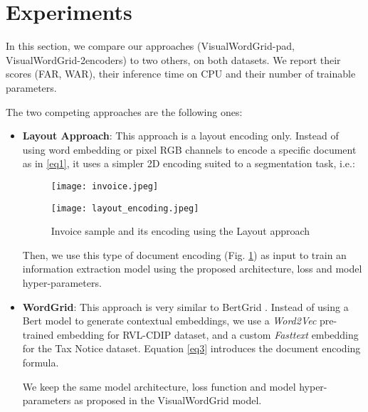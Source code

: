 \documentclass[conference]{IEEEtran}
\begin{document}
\section{Experiments}
In this section, we compare our approaches (VisualWordGrid-pad, VisualWordGrid-2encoders) to two others, on both datasets. We report their scores (FAR, WAR),  their inference time on CPU and their number of trainable parameters.

The two competing approaches are the following ones:
\begin{itemize}
    \item \textbf{Layout Approach}: This approach is a layout encoding only. Instead of using word embedding or pixel RGB channels to encode a specific document as in \eqref{eq1}, it uses a simpler 2D encoding suited to a segmentation task, i.e.:
    

\begin{figure}[!h]
\begin{minipage}[t]{0.48\linewidth}
    \centering
    \texttt{[image: invoice.jpeg]}
    \label{f11}
\end{minipage}
\hspace{0.1cm}
\begin{minipage}[t]{0.48\linewidth} 
    \centering
    \texttt{[image: layout\_encoding.jpeg]}
    \label{f22}
\end{minipage}        
\caption{Invoice sample and its encoding using the Layout approach}
\label{fig:layout}
\end{figure}  


Then, we use this type of document encoding (Fig. \ref{fig:layout}) as input to train an information extraction model  using the proposed architecture, loss and model hyper-parameters. 

\item \textbf{WordGrid}: This approach is very similar to BertGrid \cite{bertgrid}. Instead of using a Bert \cite{bert} model to generate contextual embeddings, we use a \textit{Word2Vec} pre-trained embedding for RVL-CDIP dataset, and  a custom \textit{Fasttext} embedding for the Tax Notice dataset. Equation \eqref{eq3} introduces the document encoding formula. 

We keep the same model architecture, loss function and model hyper-parameters as  proposed in the VisualWordGrid model.





\end{itemize}
\end{document}
